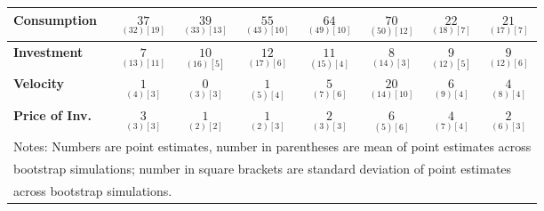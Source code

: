 \documentclass{article}
\begin{document}
\begin{tabular}{|l|c|@{}c|c|@{}c|c|@{}c|c|}
 \textbf{Consumption} & $\underset{( 32) [ 19]}{ 37}$ & $\underset{( 33) [ 13]}{ 39}$ & $\underset{( 43) [ 10]}{ 55}$ & $\underset{( 49) [ 10]}{ 64}$ & $\underset{( 50) [ 12]}{ 70}$ & $\underset{( 18) [  7]}{ 22}$ & $\underset{( 17) [  7]}{ 21}$ \\ \hline 
 \textbf{Investment} & $\underset{( 13) [ 11]}{  7}$ & $\underset{( 16) [  5]}{ 10}$ & $\underset{( 17) [  6]}{ 12}$ & $\underset{( 15) [  4]}{ 11}$ & $\underset{( 14) [  3]}{  8}$ & $\underset{( 12) [  5]}{  9}$ & $\underset{( 12) [  6]}{  9}$ \\ \hline 
 \textbf{Velocity} & $\underset{(  4) [  3]}{  1}$ & $\underset{(  3) [  3]}{  0}$ & $\underset{(  5) [  4]}{  1}$ & $\underset{(  7) [  6]}{  5}$ & $\underset{( 14) [ 10]}{ 20}$ & $\underset{(  9) [  4]}{  6}$ & $\underset{(  8) [  4]}{  4}$ \\ \hline 
 \textbf{Price of Inv.} & $\underset{(  3) [  3]}{  3}$ & $\underset{(  2) [  2]}{  1}$ & $\underset{(  2) [  3]}{  1}$ & $\underset{(  3) [  3]}{  2}$ & $\underset{(  5) [  6]}{  6}$ & $\underset{(  7) [  4]}{  4}$ & $\underset{(  6) [  3]}{  2}$ \\ \hline 
 \multicolumn{8}{|l|}{Notes: Numbers are point estimates, number in 
 parentheses are mean of point estimates across} \\ \hline 
 \multicolumn{8}{|l|}{bootstrap simulations; number in square brackets are 
 standard deviation of point estimates} \\ \hline 
 \multicolumn{8}{|l|}{across bootstrap simulations.} \\ \hline 
 \end{tabular} 
\end{document}
